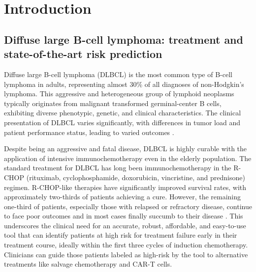 \chapter{Introduction} \label{chap:intro}

\section{Diffuse large B-cell lymphoma: treatment and state-of-the-art risk prediction}

Diffuse large B-cell lymphoma (DLBCL) is the most common type of B-cell lymphoma in adults, 
representing almost 30\% of all diagnoses of non-Hodgkin's lymphoma. 
This aggressive and heterogeneous group of 
lymphoid neoplasms typically originates from malignant transformed germinal-center B cells, 
exhibiting diverse phenotypic, genetic, and clinical characteristics. The clinical presentation of 
DLBCL varies significantly, with differences in tumor load and patient performance status, leading 
to varied outcomes \cite{dlbcl-review21}.

Despite being an aggressive and fatal disease, DLBCL is highly curable with the 
application of intensive immunochemotherapy even in the elderly population. The standard treatment 
for DLBCL has long been immunochemotherapy in the R-CHOP (rituximab, cyclophosphamide, doxorubicin, 
vincristine, and prednisone) regimen. R-CHOP-like therapies
have significantly improved survival rates, with approximately two-thirds of patients 
achieving a cure. However, the remaining one-third of patients, especially 
those with relapsed or refractory disease, continue to face poor outcomes and in most cases finally 
succumb to their disease \citep{glass17}. This underscores the clinical 
need for an accurate, robust, affordable, and easy-to-use tool that can identify patients at high risk 
for treatment failure early in their treatment course, ideally within the first three cycles of 
induction chemotherapy. Clinicians can guide those patients labeled as high-risk by the tool to 
alternative treatments like salvage chemotherapy and CAR-T cells. 

